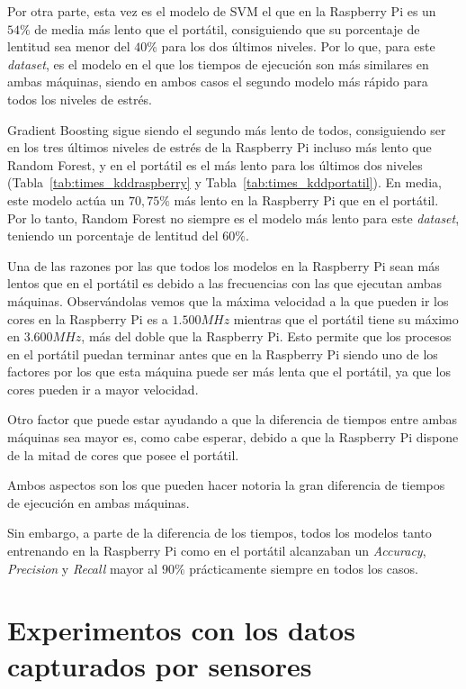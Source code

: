 \documentclass[a4paper, 12pt]{book}
\begin{document}
Por otra parte, esta vez es el modelo de SVM el que en la Raspberry Pi es un $54\%$ de media más lento que el portátil, consiguiendo que su porcentaje de lentitud sea menor del $40\%$ para los dos últimos niveles. Por lo que, para este \textit{dataset}, es el modelo en el que los tiempos de ejecución son más similares en ambas máquinas, siendo en ambos casos el segundo modelo más rápido para todos los niveles de estrés.

Gradient Boosting sigue siendo el segundo más lento de todos, consiguiendo ser en los tres últimos niveles de estrés de la Raspberry Pi incluso más lento que Random Forest, y en el portátil es el más lento para los últimos dos niveles (Tabla~\ref{tab:times_kddraspberry} y Tabla~\ref{tab:times_kddportatil}). En media, este modelo actúa un $70,75\%$ más lento en la Raspberry Pi que en el portátil. Por lo tanto, Random Forest no siempre es el modelo más lento para este \textit{dataset}, teniendo un porcentaje de lentitud del $60\%$. 

Una de las razones por las que todos los modelos en la Raspberry Pi sean más lentos que en el portátil es debido a las frecuencias con las que ejecutan ambas máquinas. Observándolas vemos que la máxima velocidad a la que pueden ir los cores en la Raspberry Pi es a $1.500MHz$ mientras que el portátil tiene su máximo en $3.600MHz$, más del doble que la Raspberry Pi. Esto permite que los procesos en el portátil puedan terminar antes que en la Raspberry Pi siendo uno de los factores por los que esta máquina puede ser más lenta que el portátil, ya que los cores pueden ir a mayor velocidad.

Otro factor que puede estar ayudando a que la diferencia de tiempos entre ambas máquinas sea mayor es, como cabe esperar, debido a que la Raspberry Pi dispone de la mitad de cores que posee el portátil.

Ambos aspectos son los que pueden hacer notoria la gran diferencia de tiempos de ejecución en ambas máquinas.

Sin embargo, a parte de la diferencia de los tiempos, todos los modelos tanto entrenando en la Raspberry Pi como en el portátil alcanzaban un \textit{Accuracy}, \textit{Precision} y \textit{Recall} mayor al $90\%$ prácticamente siempre en todos los casos.

\section{Experimentos con los datos capturados por sensores}
\label{sec:exp_dSensados}
\end{document}
